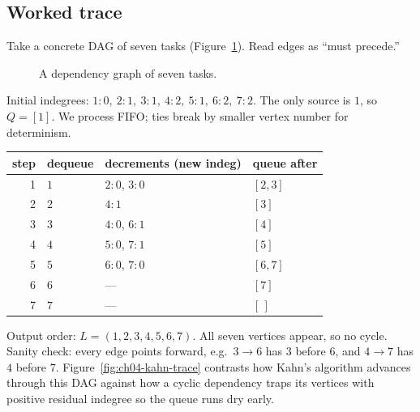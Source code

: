 \subsection*{Worked trace}

Take a concrete DAG of seven tasks (Figure~\ref{fig:ch04-seven-tasks}). Read edges as ``must precede.''

\begin{figure}[htbp]
\centering
{}
\caption{A dependency graph of seven tasks.}
\label{fig:ch04-seven-tasks}
\end{figure}

Initial indegrees: $1{:}0,\ 2{:}1,\ 3{:}1,\ 4{:}2,\ 5{:}1,\ 6{:}2,\ 7{:}2$. The only source is $1$,
so $Q=[1]$. We process FIFO; ties break by smaller vertex number for determinism.

\begin{center}
\renewcommand{\arraystretch}{1.2}
\begin{tabular}{r l l l}
\toprule
step & dequeue & decrements (new indeg) & queue after \\
\midrule
1 & $1$ & $2{:}0$, $3{:}0$ & $[2,3]$ \\
2 & $2$ & $4{:}1$ & $[3]$ \\
3 & $3$ & $4{:}0$, $6{:}1$ & $[4]$ \\
4 & $4$ & $5{:}0$, $7{:}1$ & $[5]$ \\
5 & $5$ & $6{:}0$, $7{:}0$ & $[6,7]$ \\
6 & $6$ & --- & $[7]$ \\
7 & $7$ & --- & $[\,]$ \\
\bottomrule
\end{tabular}
\end{center}

Output order: $L=(1,2,3,4,5,6,7)$. All seven vertices appear, so no cycle. Sanity check: every edge
points forward, e.g.\ $3\to 6$ has $3$ before $6$, and $4\to 7$ has $4$ before $7$.
Figure~\ref{fig:ch04-kahn-trace} contrasts how Kahn's algorithm advances through this DAG against
how a cyclic dependency traps its vertices with positive residual indegree so the queue runs dry early.

